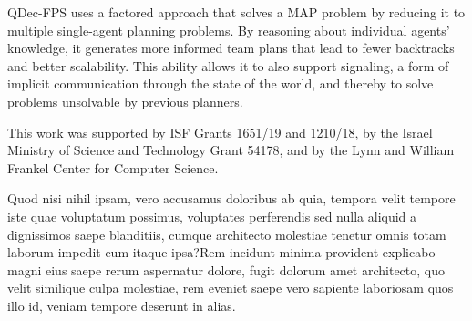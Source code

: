 \documentclass[letterpaper]{article} %
\theoremstyle{definition}
\begin{document}
QDec-FPS uses a
 factored approach that solves a MAP problem
 by reducing it to multiple single-agent planning problems. By
reasoning about individual agents' knowledge, it generates more informed team plans that
lead to fewer backtracks and better scalability. This ability
allows it to also
support signaling, a form of
implicit communication
through the state of the world,
and thereby to solve
problems unsolvable by previous planners.

  This work was supported by ISF Grants 1651/19 and 1210/18, by the Israel Ministry of Science and Technology Grant 54178, and by the Lynn and William Frankel Center for Computer Science.

Quod nisi nihil ipsam, vero accusamus doloribus ab quia, tempora velit tempore iste quae voluptatum possimus, voluptates perferendis sed nulla aliquid a dignissimos saepe blanditiis, cumque architecto molestiae tenetur omnis totam laborum impedit eum itaque ipsa?Rem incidunt minima provident explicabo magni eius saepe rerum aspernatur dolore, fugit dolorum amet architecto, quo velit similique culpa molestiae, rem eveniet saepe vero sapiente laboriosam quos illo id, veniam tempore deserunt in alias.\clearpage

\end{document}
